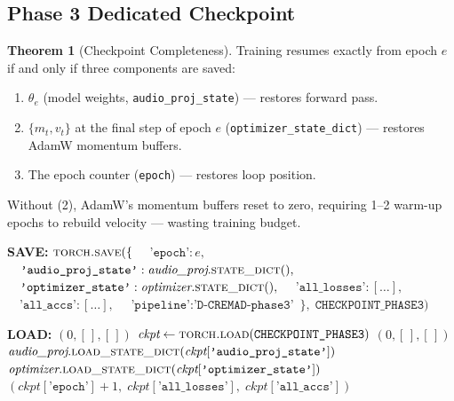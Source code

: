 \documentclass[12pt,a4paper]{article}
\theoremstyle{definition}
\newtheorem{theorem}{Theorem}[section]
\theoremstyle{remark}
\begin{document}
\subsection{Phase 3 Dedicated Checkpoint}

\begin{theorem}[Checkpoint Completeness]
Training resumes exactly from epoch $e$ if and only if three components
are saved:
\begin{enumerate}
  \item $\theta_e$ (model weights, \texttt{audio\_proj\_state}) — restores forward pass.
  \item $\{m_t, v_t\}$ at the final step of epoch $e$ (\texttt{optimizer\_state\_dict}) — restores AdamW momentum buffers.
  \item The epoch counter (\texttt{epoch}) — restores loop position.
\end{enumerate}
Without (2), AdamW's momentum buffers reset to zero, requiring 1--2
warm-up epochs to rebuild velocity — wasting training budget.
\end{theorem}

\begin{algorithm}[H]
\caption{Phase 3 Checkpoint: Save and Load}
\label{alg:checkpoint}
\begin{algorithmic}[1]
\State \textbf{SAVE:}
\State $\textsc{torch.save}(\{$
\State $\quad \texttt{'epoch'}: e,$
\State $\quad \texttt{'audio\_proj\_state'}: \textit{audio\_proj}.\textsc{state\_dict}(),$
\State $\quad \texttt{'optimizer\_state'}: \textit{optimizer}.\textsc{state\_dict}(),$
\State $\quad \texttt{'all\_losses'}: [\ldots],$
\State $\quad \texttt{'all\_accs'}: [\ldots],$
\State $\quad \texttt{'pipeline'}: \texttt{'D-CREMAD-phase3'}$
\State $\},\; \texttt{CHECKPOINT\_PHASE3})$

\State \textbf{LOAD:}
  \State \Return $(0, [\,], [\,])$ 
\EndIf
\State $\textit{ckpt} \gets \textsc{torch.load}(\texttt{CHECKPOINT\_PHASE3})$
  \State \Return $(0, [\,], [\,])$
\EndIf
\State $\textit{audio\_proj}.\textsc{load\_state\_dict}(\textit{ckpt}[\texttt{'audio\_proj\_state'}])$
\State $\textit{optimizer}.\textsc{load\_state\_dict}(\textit{ckpt}[\texttt{'optimizer\_state'}])$
\State \Return $(\textit{ckpt}[\texttt{'epoch'}] + 1,\;
               \textit{ckpt}[\texttt{'all\_losses'}],\;
               \textit{ckpt}[\texttt{'all\_accs'}])$
\end{algorithmic}
\end{algorithm}
\end{document}
